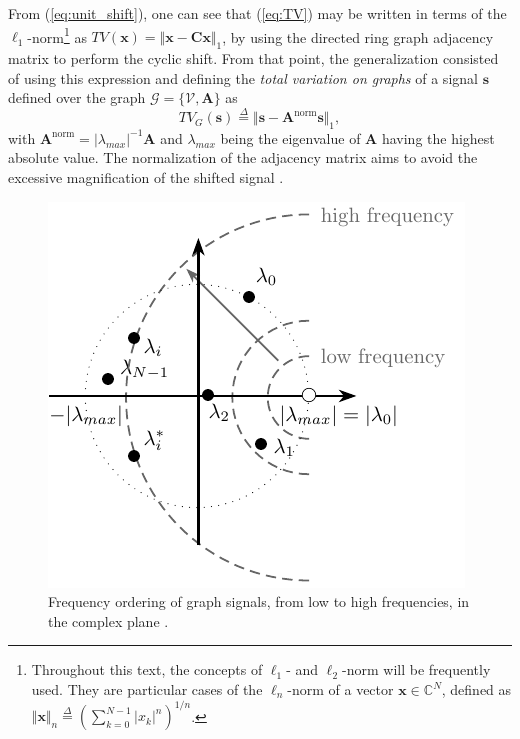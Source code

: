 From (\ref{eq:unit_shift}), one can see that (\ref{eq:TV}) may be written in terms of the $ \ell_1 $-norm\footnote{Throughout this text, the concepts of $ \ell_1 $- and $ \ell_2 $-norm will be frequently used. They are particular cases of the $ \ell_n $-norm of a vector $ \mathbf{x} \in \mathbb{C}^{N} $, defined as $ \Vert \mathbf{x}\Vert_n \overset{\Delta}{=} \left(\sum_{k=0}^{N-1} |x_k|^n\right)^{1/n} $.}
as $ TV(\mathbf{x}) = \Vert \mathbf{x} - \mathbf{C x}\Vert_1 $, by using the directed ring graph adjacency matrix to perform the cyclic shift. From that point, the generalization consisted of using this expression and defining the \emph{total variation on graphs} of a signal $ \mathbf{s} $ defined over the graph $ \mathcal{G} = \{\mathcal{V}, \mathbf{A}\} $ as
\begin{equation}
\label{eq:tv_graphs}
TV_G(\mathbf{s}) \overset{\Delta}{=} \Vert \mathbf{s} - \mathbf{A}^{\text{norm}} \mathbf{s}\Vert_1,
\end{equation}
with $ \mathbf{A}^{\text{norm}} = |\lambda_{max}|^{-1}\mathbf{A} $ and $ \lambda_{max} $ being the eigenvalue of $ \mathbf{A} $ having the highest absolute value. The normalization of the adjacency matrix aims to avoid the excessive magnification of the shifted signal \cite{sandryhaila2014frequency}.

\begin{figure}
	\centering
	\includegraphics[width=0.45\linewidth]{Figures/graph_frequency_EN.pdf}
	\caption{Frequency ordering of graph signals, from low to high frequencies, in the complex plane \cite{sandryhaila2014frequency}.}
	\label{fig:ordem_freq}
\end{figure}

